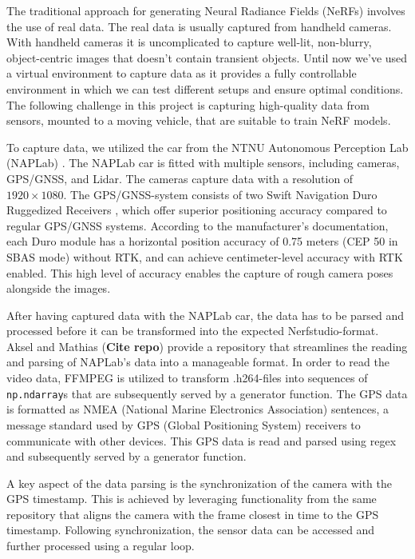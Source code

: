 The traditional approach for generating Neural Radiance Fields (NeRFs) involves the use of real data. The real data is usually captured from handheld cameras. With handheld cameras it is uncomplicated to capture well-lit, non-blurry, object-centric images that doesn't contain transient objects. Until now we've used a virtual environment to capture data as it provides a fully controllable environment in which we can test different setups and ensure optimal conditions. The following challenge in this project is capturing high-quality data from sensors, mounted to a moving vehicle, that are suitable to train NeRF models.

To capture data, we utilized the car from the NTNU Autonomous Perception Lab (NAPLab) \cite{naplab}. The NAPLab car is fitted with multiple sensors, including cameras, GPS/GNSS, and Lidar. The cameras capture data with a resolution of $1920 \times 1080$. The GPS/GNSS-system consists of two Swift Navigation Duro Ruggedized Receivers \cite{swift_navigation_duro_manual}, which offer superior positioning accuracy compared to regular GPS/GNSS systems. According to the manufacturer’s documentation, each Duro module has a horizontal position accuracy of 0.75 meters (CEP 50 in SBAS mode) without RTK, and can achieve centimeter-level accuracy with RTK enabled. This high level of accuracy enables the capture of rough camera poses alongside the images.

After having captured data with the NAPLab car, the data has to be parsed and processed before it can be transformed into the expected Nerfstudio-format. Aksel and Mathias (\textbf{Cite repo}) provide a repository that streamlines the reading and parsing of NAPLab's data into a manageable format. In order to read the video data, FFMPEG is utilized to transform .h264-files into sequences of \texttt{np.ndarray}s that are subsequently served by a generator function. The GPS data is formatted as NMEA (National Marine Electronics Association) sentences, a message standard used by GPS (Global Positioning System) receivers to communicate with other devices. This GPS data is read and parsed using regex and subsequently served by a generator function. 

A key aspect of the data parsing is the synchronization of the camera with the GPS timestamp. This is achieved by leveraging functionality from the same repository that aligns the camera with the frame closest in time to the GPS timestamp. Following synchronization, the sensor data can be accessed and further processed using a regular loop.

